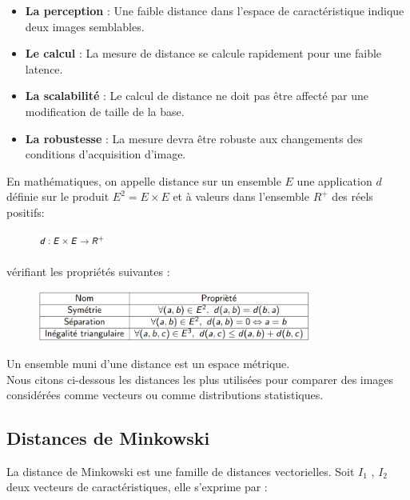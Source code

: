 \begin{itemize}
	\item  \textbf{La perception} : Une faible distance dans l'espace de caractéristique indique deux images semblables.
	
	\item \textbf{Le calcul} : La mesure de distance se calcule rapidement pour une faible latence.
	
	\item \textbf{La scalabilité }: Le calcul de distance ne doit pas être affecté par une modification de taille de la base.
	
	\item \textbf{La robustesse} : La mesure devra être robuste aux changements des conditions d'acquisition d'image.
\end{itemize}


En mathématiques, on appelle distance sur un ensemble $E$ une application $d$ définie sur le produit $E^2 = E \times E$ et à valeurs dans l'ensemble $R^+$ des réels positifs:

\begin{figure}[H]
	\centering
	\includegraphics[width=0.2\textwidth]{Figures/distanceApp.png} %
\end{figure}

vérifiant les propriétés suivantes :

\begin{figure}[H]
	\centering
	\includegraphics[width=0.8\textwidth]{Figures/distanceProp.png} %
\end{figure}

Un ensemble muni d'une distance est un espace métrique.\\


Nous citons ci-dessous les distances les plus utilisées pour comparer des images considérées comme vecteurs ou comme distributions statistiques.

\subsection{Distances de Minkowski}
La distance de Minkowski est une famille de distances vectorielles. Soit $I_1$ , $I_2$ deux vecteurs de caractéristiques, elle s'exprime par :

